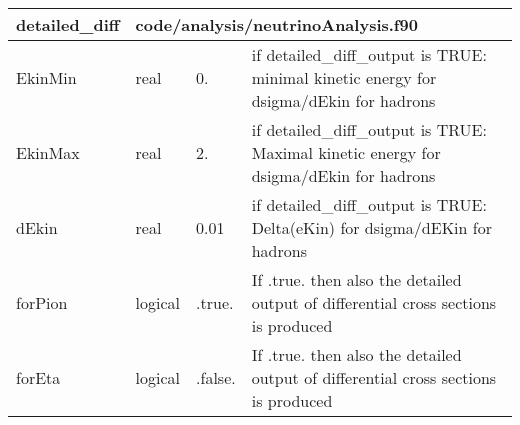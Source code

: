 \documentclass{article}
\begin{document}
\begin{longtable}{llll}
\toprule
\textbf{\large{detailed\_diff}} & \multicolumn{3}{l}{\footnotesize{code/analysis/neutrinoAnalysis.f90}}\\*
\midrule
\endfirsthead
\midrule
\endhead
EkinMin & \begin{minipage}[t]{2cm}real\end{minipage} & \begin{minipage}[t]{2cm}0.\end{minipage} & \begin{minipage}[t]{12cm}if detailed\_diff\_output is TRUE: minimal kinetic energy for dsigma/dEkin for hadrons\end{minipage}\\*
\midrule
EkinMax & \begin{minipage}[t]{2cm}real\end{minipage} & \begin{minipage}[t]{2cm}2.\end{minipage} & \begin{minipage}[t]{12cm}if detailed\_diff\_output is TRUE: Maximal kinetic energy for dsigma/dEkin for hadrons\end{minipage}\\*
\midrule
dEkin & \begin{minipage}[t]{2cm}real\end{minipage} & \begin{minipage}[t]{2cm}0.01\end{minipage} & \begin{minipage}[t]{12cm}if detailed\_diff\_output is TRUE: Delta(eKin) for dsigma/dEKin  for hadrons\end{minipage}\\*
\midrule
forPion & \begin{minipage}[t]{2cm}logical\end{minipage} & \begin{minipage}[t]{2cm}.true.\end{minipage} & \begin{minipage}[t]{12cm}If .true. then also the detailed output of differential cross sections is produced\end{minipage}\\*
\midrule
forEta & \begin{minipage}[t]{2cm}logical\end{minipage} & \begin{minipage}[t]{2cm}.false.\end{minipage} & \begin{minipage}[t]{12cm}If .true. then also the detailed output of differential cross sections is produced\end{minipage}\\*

\end{longtable}
\end{document}
